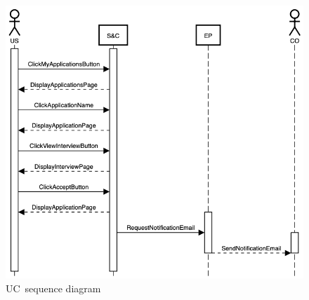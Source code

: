 \begin{figure}
    \centering
    \includegraphics[width=14cm]{images/sequence-diagrams/student-accepts-interview.png}
    \caption{UC\theuc\ sequence diagram}
\end{figure}



